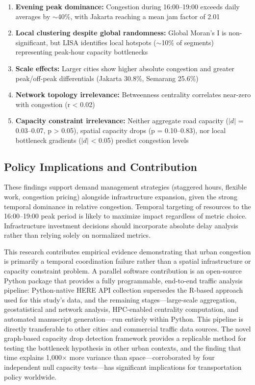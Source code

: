 \documentclass[12pt,a4paper]{article}
\begin{document}
\begin{enumerate}
\item \textbf{Evening peak dominance:} Congestion during 16:00--19:00 exceeds daily averages by $\sim$40\%, with Jakarta reaching a mean jam factor of 2.01
\item \textbf{Local clustering despite global randomness:} Global Moran's I is non-significant, but LISA identifies local hotspots ($\sim$10\% of segments) representing peak-hour capacity bottlenecks
\item \textbf{Scale effects:} Larger cities show higher absolute congestion and greater peak/off-peak differentials (Jakarta 30.8\%, Semarang 25.6\%)
\item \textbf{Network topology irrelevance:} Betweenness centrality correlates near-zero with congestion (r < 0.02)
\item \textbf{Capacity constraint irrelevance:} Neither aggregate road capacity ($|d|$ = 0.03--0.07, p > 0.05), spatial capacity drops (p = 0.10--0.83), nor local bottleneck gradients ($|d|$ < 0.05) predict congestion levels
\end{enumerate}

\subsection{Policy Implications and Contribution}

These findings support demand management strategies (staggered hours, flexible work, congestion pricing) alongside infrastructure expansion, given the strong temporal dominance in relative congestion. Temporal targeting of resources to the 16:00--19:00 peak period is likely to maximize impact regardless of metric choice. Infrastructure investment decisions should incorporate absolute delay analysis rather than relying solely on normalized metrics.

This research contributes empirical evidence demonstrating that urban congestion is primarily a temporal coordination failure rather than a spatial infrastructure or capacity constraint problem. A parallel software contribution is an open-source Python package that provides a fully programmable, end-to-end traffic analysis pipeline: Python-native HERE API collection supersedes the R-based approach used for this study's data, and the remaining stages---large-scale aggregation, geostatistical and network analysis, HPC-enabled centrality computation, and automated manuscript generation---run entirely within Python. This pipeline is directly transferable to other cities and commercial traffic data sources. The novel graph-based capacity drop detection framework provides a replicable method for testing the bottleneck hypothesis in other urban contexts, and the finding that time explains 1,000$\times$ more variance than space---corroborated by four independent null capacity tests---has significant implications for transportation policy worldwide.
\end{document}
